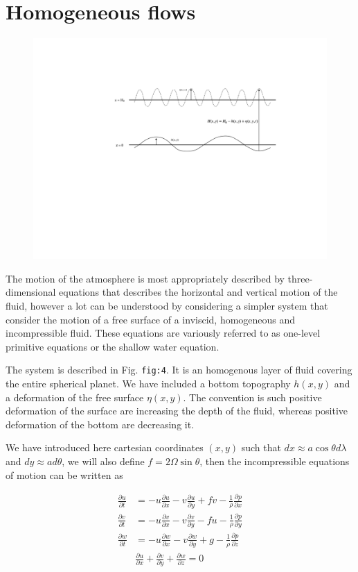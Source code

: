 \section{Homogeneous flows}\label{homogeneous-flows}

\begin{figure}
\centering
\includegraphics[width = .9 \textwidth]{./figs/GD/shw.png}
\caption{}
\label{}
\end{figure}


The motion of the atmosphere is most appropriately described by
three-dimensional equations that describes the horizontal and vertical
motion of the fluid, however a lot can be understood by considering a
simpler system that consider the motion of a free surface of a inviscid,
homogeneous and incompressible fluid. These equations are variously
referred to as one-level primitive equations or the shallow water
equation.

The system is described in Fig. \texttt{fig:4}. It is an homogenous
layer of fluid covering the entire spherical planet. We have included a
bottom topography \(h(x,y)\) and a deformation of the free surface
\(\eta(x,y)\). The convention is such positive deformation of the
surface are increasing the depth of the fluid, whereas positive
deformation of the bottom are decreasing it.

We have introduced here cartesian coordinates \((x,y)\) such that
\(dx \approx a \cos\theta d \lambda\) and \(dy \approx a d\theta\), we
will also define \(f= 2\Omega \sin\theta\), then the incompressible
equations of motion can be written as

\[
\begin{aligned}
\frac{\partial u}{\partial t} &= -u \frac{\partial u}{\partial x} -v \frac{\partial u}{\partial y} + f v -\frac{1}{\rho}\frac{\partial p}{\partial x} \\
\frac{\partial v}{\partial t} &= -u \frac{\partial v}{\partial x} -v \frac{\partial v}{\partial y} - f u -\frac{1}{\rho}\frac{\partial p}{\partial y}  \\
\frac{\partial w}{\partial t} &= -u \frac{\partial w}{\partial x} -v \frac{\partial w}{\partial y} + g -\frac{1}{\rho}\frac{\partial p}{\partial z}  \\
&\frac{\partial u}{\partial x} + \frac{\partial v}{\partial y} + \frac{\partial w}{\partial z} = 0
\end{aligned}
\]


